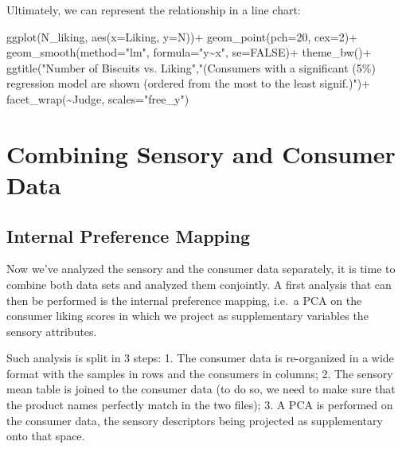 \documentclass[
]{book}
\newenvironment{Shaded}{\begin{snugshade}}{\end{snugshade}}
\newcommand{\AttributeTok}[1]{\textcolor[rgb]{0.77,0.63,0.00}{#1}}
\newcommand{\ConstantTok}[1]{\textcolor[rgb]{0.00,0.00,0.00}{#1}}
\newcommand{\DecValTok}[1]{\textcolor[rgb]{0.00,0.00,0.81}{#1}}
\newcommand{\FunctionTok}[1]{\textcolor[rgb]{0.00,0.00,0.00}{#1}}
\newcommand{\NormalTok}[1]{#1}
\newcommand{\SpecialCharTok}[1]{\textcolor[rgb]{0.00,0.00,0.00}{#1}}
\newcommand{\StringTok}[1]{\textcolor[rgb]{0.31,0.60,0.02}{#1}}
\begin{document}
Ultimately, we can represent the relationship in a line chart:

\begin{Shaded}
\begin{Highlighting}[]
\FunctionTok{ggplot}\NormalTok{(N\_liking, }\FunctionTok{aes}\NormalTok{(}\AttributeTok{x=}\NormalTok{Liking, }\AttributeTok{y=}\NormalTok{N))}\SpecialCharTok{+}
  \FunctionTok{geom\_point}\NormalTok{(}\AttributeTok{pch=}\DecValTok{20}\NormalTok{, }\AttributeTok{cex=}\DecValTok{2}\NormalTok{)}\SpecialCharTok{+}
  \FunctionTok{geom\_smooth}\NormalTok{(}\AttributeTok{method=}\StringTok{"lm"}\NormalTok{, }\AttributeTok{formula=}\StringTok{"y\textasciitilde{}x"}\NormalTok{, }\AttributeTok{se=}\ConstantTok{FALSE}\NormalTok{)}\SpecialCharTok{+}
  \FunctionTok{theme\_bw}\NormalTok{()}\SpecialCharTok{+}
  \FunctionTok{ggtitle}\NormalTok{(}\StringTok{"Number of Biscuits vs. Liking"}\NormalTok{,}\StringTok{"(Consumers with a significant (5\%) regression model are shown (ordered from the most to the least signif.)"}\NormalTok{)}\SpecialCharTok{+}
  \FunctionTok{facet\_wrap}\NormalTok{(}\SpecialCharTok{\textasciitilde{}}\NormalTok{Judge, }\AttributeTok{scales=}\StringTok{"free\_y"}\NormalTok{)}
\end{Highlighting}
\end{Shaded}

\hypertarget{combining-sensory-and-consumer-data}{%
\section{Combining Sensory and Consumer Data}\label{combining-sensory-and-consumer-data}}

\hypertarget{internal-preference-mapping}{%
\subsection{Internal Preference Mapping}\label{internal-preference-mapping}}

Now we've analyzed the sensory and the consumer data separately, it is time to combine both data sets and analyzed them conjointly. A first analysis that can then be performed is the internal preference mapping, i.e.~a PCA on the consumer liking scores in which we project as supplementary variables the sensory attributes.

Such analysis is split in 3 steps:
1. The consumer data is re-organized in a wide format with the samples in rows and the consumers in columns;
2. The sensory mean table is joined to the consumer data (to do so, we need to make sure that the product names perfectly match in the two files);
3. A PCA is performed on the consumer data, the sensory descriptors being projected as supplementary onto that space.
\end{document}
